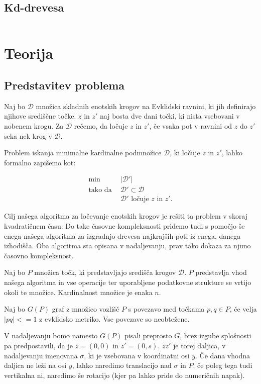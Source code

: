 \documentclass[a4paper, 12pt]{book}
\newcommand{\D}{\ensuremath{\mathcal{D}}}
\begin{document}
\section{Kd-drevesa}\begin{equation}
\end{equation}


\chapter{Teorija}
\section{Predstavitev problema}
Naj bo $\D$ množica skladnih enotskih krogov na Evklidski ravnini, ki jih definirajo njihove središčne točke.  $z$ in $z'$ naj bosta dve dani točki, ki nista vsebovani v nobenem krogu. Za $\D$ rečemo, da ločuje $z$ in $z'$, če vsaka pot v ravnini od $z$ do $z'$ seka nek krog v $\D$.

Problem iskanja minimalne kardinalne podmnožice $\D$, ki ločuje $z$ in $z'$, lahko formalno zapišemo kot:

\begin{align*}
	\min ~~		& |\D'|\\
	 \mbox{tako da}~~ & \D'\subset \D\\
				&	\D'\text{ ločuje $z$ in $z'$}. 
\end{align*}

Cilj našega algoritma za ločevanje enotskih krogov je rešiti ta problem v skoraj kvadratičnem času. Do take časovne kompleksnosti pridemo tudi s pomočjo še enega našega algoritma za izgradnjo drevesa najkrajših poti iz enega, danega izhodišča. Oba algoritma sta opisana v nadaljevanju, prav tako dokaza za njuno časovno kompleksnost.

Naj bo $P$ množica točk, ki predstavljajo središča krogov $\D$. $P$ predstavlja vhod našega algoritma in vse operacije ter uporabljene podatkovne strukture se vrtijo okoli te množice. Kardinalnost množice je enaka $n$. 

Naj bo $G(P)$ graf z množico vozlišč $P$ s povezavo med točkama $p,q \in P$, če velja $|pq| <= 1$ z evklidsko metriko. Vse povezave so neobtežene.

V nadaljevanju bomo namesto $G(P)$ pisali preprosto $G$, brez izgube splošnosti pa predpostavili, da je $z=(0,0)$ in $z'=(0,s)$. $zz'$ je torej daljica, v nadaljevanju imenovana $\sigma$, ki je vsebovana v koordinatni osi $y$. Če dana vhodna daljica ne leži na osi $y$, lahko naredimo translacijo nad $\sigma$ in $P$; če poleg tega tudi vertikalna ni, naredimo še rotacijo (kjer pa lahko pride do numeričnih napak). 
\end{document}
